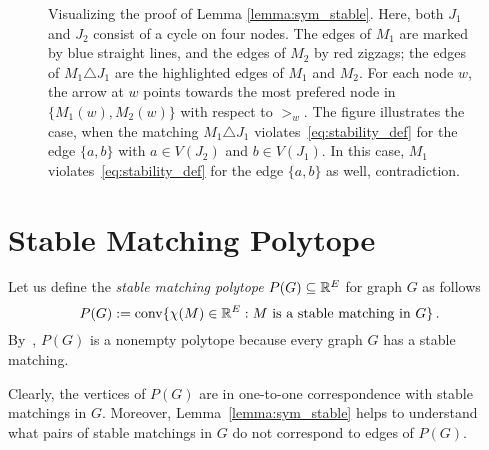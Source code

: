 \documentclass[3p,times]{elsarticle}
\DeclareMathOperator{\convOp}{conv}
\newcommand{\conv}{\convOp}
\begin{document}
\begin{figure}[H]
\caption{Visualizing the proof of Lemma \ref{lemma:sym_stable}.  Here, both $J_1$ and $J_2$ consist of a cycle on four nodes. The edges of $M_1$ are marked by blue straight lines, and the edges of $M_2$ by red zigzags; the edges of $M_1\triangle J_1$ are the highlighted edges of $M_1$ and $M_2$. For each node $w$, the arrow at $w$ points towards the most prefered node in $\{M_1(w), M_2(w)\}$ with respect to $>_w$.
The figure illustrates the case, when the matching $M_1\triangle J_1$ violates~\eqref{eq:stability_def} for the edge $\{a,b\}$ with $a\in V(J_2)$
  and $b\in V(J_1)$. In this case, $M_1$ violates~\eqref{eq:stability_def} for the edge $\{a,b\}$ as well, contradiction.}
\label{fig:sym_stable}
\end{figure}

\section{Stable Matching Polytope}

Let us define the \emph{stable matching polytope} $P(G)\subseteq\mathbb{R}^E$ for graph $G$ as follows
$$
	P(G):=\conv\{\chi(M)\in\R^E: M \text{ is a stable matching in } G\}\,.
$$
By~\cite{gale1962college}, $P(G)$ is a nonempty polytope because every
graph $G$ has a stable matching.

Clearly, the vertices of $P(G)$ are in one-to-one correspondence with
stable matchings in $G$. Moreover, Lemma~\ref{lemma:sym_stable} helps
to understand what pairs of stable matchings in $G$ do not correspond
to edges of $P(G)$.
\end{document}
